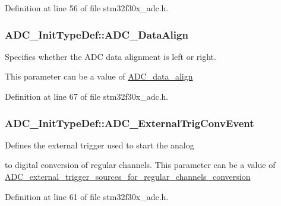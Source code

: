 Definition at line 56 of file stm32f30x\-\_\-adc.\-h.

\hypertarget{struct_a_d_c___init_type_def_a622e89d8fba3900f20aaf40d5560ab7b}{
\subsubsection[{A\-D\-C\-\_\-\-Data\-Align}]{ A\-D\-C\-\_\-\-Init\-Type\-Def\-::\-A\-D\-C\-\_\-\-Data\-Align}}\label{struct_a_d_c___init_type_def_a622e89d8fba3900f20aaf40d5560ab7b}
\begin{DoxyVerb}                 Specifies whether the ADC data alignment is left or right.
\end{DoxyVerb}
 This parameter can be a value of \hyperlink{group___a_d_c__data__align}{A\-D\-C\-\_\-data\-\_\-align} 

Definition at line 67 of file stm32f30x\-\_\-adc.\-h.

\hypertarget{struct_a_d_c___init_type_def_aeb8674fbc45876945d027fde24067d84}{
\subsubsection[{A\-D\-C\-\_\-\-External\-Trig\-Conv\-Event}]{ A\-D\-C\-\_\-\-Init\-Type\-Def\-::\-A\-D\-C\-\_\-\-External\-Trig\-Conv\-Event}}\label{struct_a_d_c___init_type_def_aeb8674fbc45876945d027fde24067d84}
\begin{DoxyVerb}       Defines the external trigger used to start the analog
\end{DoxyVerb}
 to digital conversion of regular channels. This parameter can be a value of \hyperlink{group___a_d_c__external__trigger__sources__for__regular__channels__conversion}{A\-D\-C\-\_\-external\-\_\-trigger\-\_\-sources\-\_\-for\-\_\-regular\-\_\-channels\-\_\-conversion} 

Definition at line 61 of file stm32f30x\-\_\-adc.\-h.

